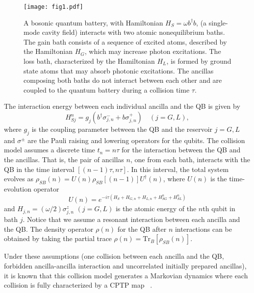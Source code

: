 \documentclass[%
reprint,
superscriptaddress,
amsmath,amssymb,
aps,
pra,
]{revtex4-2}
\begin{document}
\begin{figure}[H]
\texttt{[image: fig1.pdf]}
\caption{A bosonic quantum battery, with Hamiltonian $H_S = \omega b^{\dagger}b$, (a single-mode cavity field) interacts with two atomic nonequilibrium baths. The gain bath consists of a sequence of excited atoms, described by the Hamiltonian $H_G$, which may increase photon excitations. The loss bath, characterized by the Hamiltonian $H_L$, is formed by ground state atoms that may absorb photonic excitations. The ancillas composing both baths do not interact between each other and are coupled to the quantum battery during a collision time $\tau$.}
\label{fig1} 
\end{figure}

The interaction energy between each individual ancilla and the QB is given by 
\begin{equation}
    H_{Sj}^n = g_j(b^{\dagger} \sigma_{j,n}^{-} + b\sigma_{j,n}^{+}) \quad (j = G,L),
\end{equation}
where $g_j$ is the coupling parameter between the QB and the reservoir $j=G,L$ and $\sigma^{\pm}$ are the Pauli raising and lowering operators for the qubits. The collision model assumes a discrete time $t_n = n\tau$ for the interaction between the QB and the ancillas. That is, the pair of ancillas $n$, one from each bath, interacts with the QB in the time interval $[(n-1)\tau, n\tau]$. In this interval, the total system evolves as $\rho_{SB}(n) = U(n) \rho_{SB}[(n-1)] U^{\dagger}(n)$, where $U(n)$ is the time-evolution operator
\begin{equation}
    U(n) = e^{-i\tau(H_S + H_{G,n} + H_{L,n} + H^n_{SG} + H^n_{SL})}
\end{equation} 
and $H_{j,n} = (\omega/2)\sigma^{z}_{j,n}$ $(j=G,L)$ is the atomic energy of the $n$th qubit in bath $j$. Notice that we assume a resonant interaction between each ancilla and the QB. The density operator $\rho(n)$ for the QB after $n$ interactions can be obtained by taking the partial trace $\rho(n) = \text{Tr}_{B}[\rho_{SB}(n)]$.

Under these assumptions (one collision between each ancilla and the QB, forbidden ancilla-ancilla interaction and uncorrelated initially prepared ancillas), it is known that this collision model generates a Markovian dynamics where each collision is fully characterized by a CPTP map ~\cite{ciccarello2022quantum}. 

\end{document}
